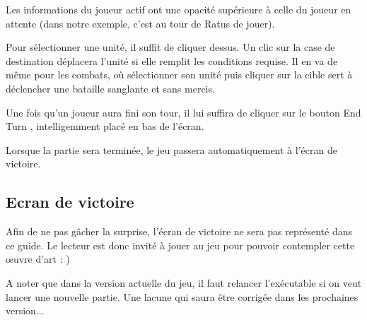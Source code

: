 		Les informations du joueur actif ont une opacité supérieure à celle du joueur en attente (dans notre exemple, c'est au tour de Ratus de jouer).

		Pour sélectionner une unité, il suffit de cliquer dessus. Un clic sur la case de destination déplacera l'unité si elle remplit les conditions requise. Il en va de même pour les combats, où sélectionner son unité puis cliquer sur la cible sert à déclencher une bataille sanglante et sans mercis.

		Une fois qu'un joueur aura fini son tour, il lui suffira de cliquer sur le bouton \og End Turn \fg, intelligemment placé en bas de l'écran.

		Lorsque la partie sera terminée, le jeu passera automatiquement à l'écran de victoire.

	\subsection{Ecran de victoire}
		Afin de ne pas gâcher la surprise, l'écran de victoire ne sera pas représenté dans ce guide. Le lecteur est donc invité à jouer au jeu pour pouvoir contempler cette œuvre d'art : )

		A noter que dans la version actuelle du jeu, il faut relancer l’exécutable si on veut lancer une nouvelle partie. Une lacune qui saura être corrigée dans les prochaines version...